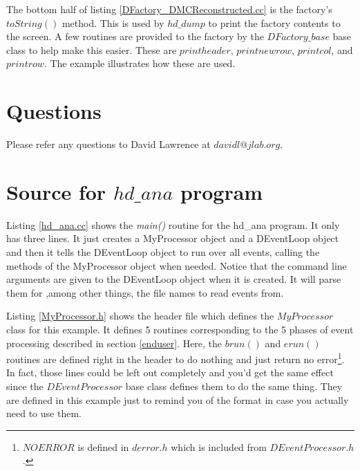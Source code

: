 \documentclass[12pt]{article}
\begin{document}



The bottom half of listing \ref{DFactory_DMCReconstructed.cc} is
the factory's $toString()$ method. This is used by $hd\_dump$
to print the factory contents to the screen. A few routines are
provided to the factory by the $DFactory\_base$ base class to
help make this easier. These are $printheader$, $printnewrow$,
$printcol$, and $printrow$. The example illustrates how these
are used.

\section{Questions}
Please refer any questions to David Lawrence at $davidl@jlab.org$.

\newpage
\appendix
\section{Source for $hd\_ana$ program}
\label{hd_ana_src}

Listing \ref{hd_ana.cc} shows the {\it main()} routine for the
hd\_ana program. It only has three lines. It just creates a MyProcessor
object and a DEventLoop object and then it tells the DEventLoop object
to run over all events, calling the methods of the MyProcessor object
when needed. Notice that the command line arguments are given to 
the DEventLoop object when it is created. It will parse them for
,among other things, the file names to read events from.



\newpage
Listing \ref{MyProcessor.h} shows the header file which defines the
$MyProcessor$ class for this example. It defines 5 routines
corresponding to the 5
phases of event processing described in section \ref{enduser}. Here,
the $brun()$ and $erun()$ routines are defined right in the header
to do nothing and just return no error\footnote{$NOERROR$ is defined
in $derror.h$ which is included from $DEventProcessor.h$.}. 
In fact, those lines could be left out completely and you'd get the
same effect since the $DEventProcessor$ base class defines them
to do the same thing. They are defined in this example just to
remind you of the format in case you actually need to use them.\\
\end{document}
